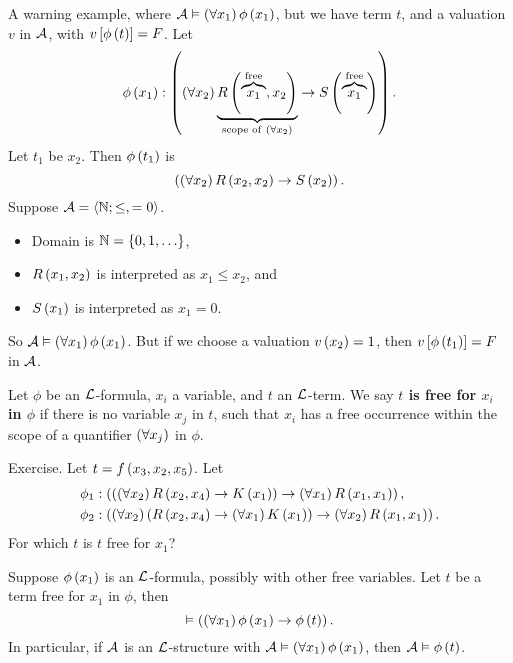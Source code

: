 \begin{example2}
A warning example, where $ \AA \vDash \fab{x_1}\phi\rb{x_1} $, but we have term $ t $, and a valuation $ v $ in $ \AA $, with $ v\sb{\phi\rb{t}} = F $. Let
$$ \phi\rb{x_1} : \impb{\fab{x_2}\underbrace{R\rb{\overbrace{x_1}^{\text{free}}, x_2}}_{\text{scope of} \ \fab{x_2}}}{S\rb{\overbrace{x_1}^{\text{free}}}}. $$
Let $ t_1 $ be $ x_2 $. Then $ \phi\rb{t_1} $ is
$$ \impb{\fab{x_2}R\rb{x_2, x_2}}{S\rb{x_2}}. $$
Suppose $ \AA = \ab{\N; \le, = 0} $.
\begin{itemize}
\item Domain is $ \N = \cb{0, 1, \dots} $,
\item $ R\rb{x_1, x_2} $ is interpreted as $ x_1 \le x_2 $, and
\item $ S\rb{x_1} $ is interpreted as $ x_1 = 0 $.
\end{itemize}
So $ \AA \vDash \fab{x_1}\phi\rb{x_1} $. But if we choose a valuation $ v\rb{x_2} = 1 $, then $ v\sb{\phi\rb{t_1}} = F $ in $ \AA $.
\end{example2}

\pagebreak

\begin{definition}
Let $ \phi $ be an $ \LL $-formula, $ x_i $ a variable, and $ t $ an $ \LL $-term. We say \textbf{$ t $ is free for $ x_i $ in $ \phi $} if there is no variable $ x_j $ in $ t $, such that $ x_i $ has a free occurrence within the scope of a quantifier $ \fab{x_j} $ in $ \phi $.
\end{definition}

\begin{example2}
Exercise. Let $ t = f\rb{x_3, x_2, x_5} $. Let
\begin{align*}
\phi_1 & : \impb{\impb{\fab{x_2}R\rb{x_2, x_4}}{K\rb{x_1}}}{\fab{x_1}R\rb{x_1, x_1}}, \\
\phi_2 & : \impb{\fab{x_2}\impb{R\rb{x_2, x_4}}{\fab{x_1}K\rb{x_1}}}{\fab{x_2}R\rb{x_1, x_1}}.
\end{align*}
For which $ t $ is $ t $ free for $ x_1 $?
\end{example2}

\begin{theorem}
\label{thm:2.3.6}
Suppose $ \phi\rb{x_1} $ is an $ \LL $-formula, possibly with other free variables. Let $ t $ be a term free for $ x_1 $ in $ \phi $, then
$$ \vDash \impb{\fab{x_1}\phi\rb{x_1}}{\phi\rb{t}}. $$
In particular, if $ \AA $ is an $ \LL $-structure with $ \AA \vDash \fab{x_1}\phi\rb{x_1} $, then $ \AA \vDash \phi\rb{t} $.
\end{theorem}

